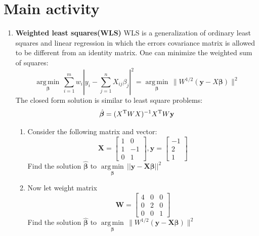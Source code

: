 \documentclass[12pt]{article}
\def \bX{\boldsymbol{X}}
\begin{document}
\section{Main activity}

\begin{enumerate}
    \item \textbf{Weighted least squares(WLS)} WLS is a generalization of ordinary least squares and linear regression in which the errors covariance matrix is allowed to be different from an identity matrix. One can minimize the weighted sum of squares:\\
        $$\underset{\boldsymbol \beta}{ \operatorname{arg\,min} }\, \sum_{i=1}^{m} w_i \left|y_i - \sum_{j=1}^{n} X_{ij}\beta_j\right|^2 = \underset{\boldsymbol \beta}{ \operatorname{arg\,min} } \, \big\|W^{1/2} (\mathbf y - X \boldsymbol \beta) \big\|^2$$
    The closed form solution is similar to least square problems:\\
        $$\hat{\boldsymbol{\beta}} = (X^{\rm T} W X)^{-1} X^{\rm T} W \mathbf y$$
    
    \begin{enumerate}
    \item Consider the following matrix and vector:\\
$$ \bX = \left [ \begin{matrix} 1 & 0 \\ 1 & -1 \\ 0 & 1 \end{matrix} \right ], \boldsymbol{y} = \left [ \begin{matrix} -1 \\ 2 \\ 1 \end{matrix} \right ] $$
    Find the solution $\boldsymbol{\hat{\beta}}$ to $\underset{\boldsymbol \beta}{ \operatorname{arg\,min} } \,||\boldsymbol{y} -\bX\boldsymbol{{\beta}}||^2$
    \item Now let weight matrix $$ \boldsymbol{W} = \left [ \begin{matrix} 4 & 0 & 0 \\ 0 & 2 & 0 \\ 0 & 0 & 1 \end{matrix} \right ] $$
    Find the solution  $\boldsymbol{\hat{\beta}}$ to $\underset{\boldsymbol \beta}{ \operatorname{arg\,min} } \, \big\|W^{1/2} (\boldsymbol{y} -\bX\boldsymbol{{\beta}}) \big\|^2$
    \end{enumerate}


\end{enumerate}
\end{document}
